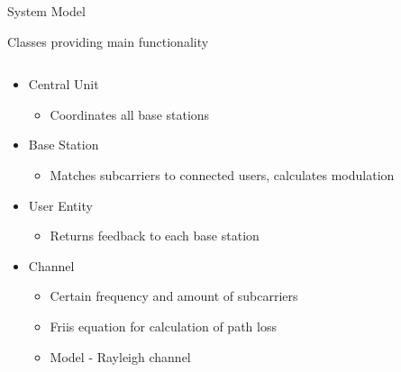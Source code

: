 \documentclass[xcolor={cmyk}]{beamer}
\begin{document}
  \begin{frame}{System Model}
	 \begin{block}{Classes providing main functionality}
	 	\begin{columns}
			\begin{column}{.9\textwidth}
				\begin{itemize}
					\item Central Unit
					\begin{itemize}
						\item Coordinates all base stations 
					\end{itemize}
					\item Base Station
					\begin{itemize}
						\item Matches subcarriers to connected users, calculates modulation
					\end{itemize}
					\item User Entity
					\begin{itemize}
						\item Returns feedback to each base station
					\end{itemize}
					
					\item Channel
					\begin{itemize}
						\item Certain frequency and amount of subcarriers
						\item Friis equation for calculation of path loss
						\item Model - Rayleigh channel
					\end{itemize}
				\end{itemize}
			\end{column}
		\end{columns}
	 \end{block}
 \end{frame}
 
\end{document}
